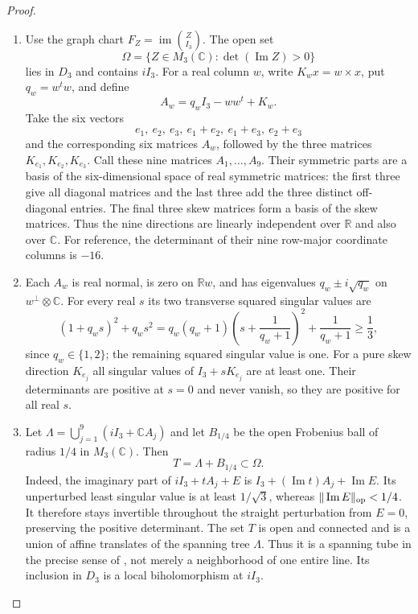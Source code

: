 \begin{proof}
\begin{enumerate}[label=\arabic*.]
\item Use the graph chart $F_Z=\operatorname{im}\binom Z{I_3}$.
The open set
\[
 \Omega=\{Z\in M_3(\mathbb C):\det(\operatorname{Im}Z)>0\}
 \tag{F.O1}\label{maps:eq:F.O1}
\]
lies in $D_3$ and contains $iI_3$.  For a real column $w$, write
$K_w x=w\times x$, put $q_w=w^tw$, and define
\[
 A_w=q_wI_3-ww^t+K_w.
 \tag{F.O2}\label{maps:eq:F.O2}
\]
Take the six vectors
\[
 e_1,\ e_2,\ e_3,\ e_1+e_2,\ e_1+e_3,\ e_2+e_3
\]
and the corresponding six matrices $A_w$, followed by the three
matrices $K_{e_1},K_{e_2},K_{e_3}$.  Call these nine matrices
$A_1,\ldots,A_9$.  Their symmetric parts are a basis of the
six-dimensional space of real symmetric matrices: the first three
give all diagonal matrices and the last three add the three distinct
off-diagonal entries.  The final three skew matrices form a basis
of the skew matrices.  Thus the nine directions are linearly
independent over $\mathbb R$ and also over $\mathbb C$.
For reference, the determinant of their nine row-major coordinate
columns is $-16$.

\item Each $A_w$ is real normal, is zero on $\mathbb Rw$, and has
eigenvalues $q_w\pm i\sqrt{q_w}$ on $w^\perp\otimes\mathbb C$.
For every real $s$ its two transverse squared singular values are
\[
 (1+q_ws)^2+q_ws^2
 =q_w(q_w+1)\left(s+\frac1{q_w+1}\right)^2
       +\frac1{q_w+1}\ge\frac13,
 \tag{F.O3}\label{maps:eq:F.O3}
\]
since $q_w\in\{1,2\}$; the remaining squared singular value is one.
For a pure skew direction $K_{e_j}$ all singular values of
$I_3+sK_{e_j}$ are at least one.  Their determinants are positive
at $s=0$ and never vanish, so they are positive for all real $s$.

\item Let $\Lambda=\bigcup_{j=1}^9(iI_3+\mathbb C A_j)$ and let
$B_{1/4}$ be the open Frobenius ball of radius $1/4$ in
$M_3(\mathbb C)$.  Then
\[
 T=\Lambda+B_{1/4}\subset\Omega.
 \tag{F.O4}\label{maps:eq:F.O4}
\]
Indeed, the imaginary part of $iI_3+tA_j+E$ is
$I_3+(\operatorname{Im}t)A_j+\operatorname{Im}E$.
Its unperturbed least singular value is at least $1/\sqrt3$,
whereas $\|\operatorname{Im}E\|_{\rm op}<1/4$.
It therefore stays invertible throughout the straight perturbation
from $E=0$, preserving the positive determinant.
The set $T$ is open and connected and is a union of affine
translates of the spanning tree $\Lambda$.  Thus it is a spanning
tube in the precise sense of \cite[Definition 2.1, p.~4]{IVVOkaOneV5},
not merely a neighborhood of one entire line.  Its inclusion in
$D_3$ is a local biholomorphism at $iI_3$.


\end{enumerate}
\end{proof}
